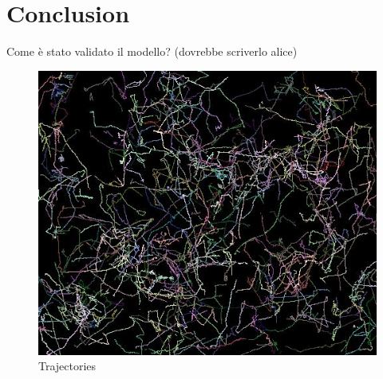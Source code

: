 \documentclass[conference]{IEEEtran}
\begin{document}
\section{Conclusion}
Come è stato validato il modello? (dovrebbe scriverlo alice)

    \begin{figure}
      \begin{center}
        \includegraphics[scale=0.5]{./images/result.png}
        \caption{Trajectories}
        \label{fig:}
      \end{center}
    \end{figure}






%
\end{document}
